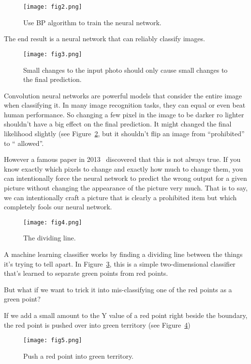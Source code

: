 \documentclass[10pt,twocolumn,letterpaper]{article}
\begin{document}
	\begin{figure}[h]
		\centering
		\texttt{[image: fig2.png]}
		\caption{Use BP algorithm to train the neural network.}\label{BP}
	\end{figure}
	\par
	The end result is a neural network that can reliably classify images.
	\par
	\begin{figure}[h]
		\centering
		\texttt{[image: fig3.png]}
		\caption{Small changes to the input photo should only cause small changes to the final prediction.} \label{fig3}
	\end{figure}
	\par
	Convolution neural networks are powerful models that consider the entire image when classifying it. In many image recognition tasks, they can equal or even beat human performance. So changing a few pixel in the image to be darker ro lighter shouldn't have a big effect on the final prediction. It might changed the final likelihood slightly (see Figure~\ref{fig3}, but it shouldn't flip an image from ``prohibited'' to  `` allowed''.
	\par
	However a famous paper in 2013~\cite{Christian} discovered that this is not always true. If you know exactly which pixels to change and exactly how much to change them, you can intentionally force the neural network to predict the wrong output for a given picture without changing the appearance of the picture very much. That is to say, we can intentionally craft a picture that is clearly a prohibited item but which completely fools our neural network.
	\begin{figure}[h]
		\centering
		\texttt{[image: fig4.png]}
		\caption{The dividing line.} \label{fig4}
	\end{figure}
	\par
	A machine learning classifier works by finding a dividing line between the things it's trying to tell apart. In Figure~\ref{fig4}, this is a simple two-dimensional classifier that's learned to separate green points from red points.
	\par
	But what if we want to trick it into mis-classifying one of the red points as a green point?
	\par
	If we add a small amount to the Y value of a red point right beside the boundary, the red point is pushed over into green territory (see Figure~\ref{fig5})
	\begin{figure}[h]
		\centering
		\texttt{[image: fig5.png]}
		\caption{Push a red point into green territory.} \label{fig5}
	\end{figure}
\end{document}
